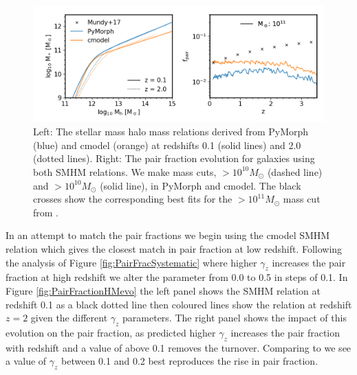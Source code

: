 \begin{figure}
	\centering
	\includegraphics[width = \linewidth]{Figures/Chapter5/PairFractionData.png}
    \caption{Left: The stellar mass halo mass relations derived from PyMorph (blue) and cmodel (orange) at redshifts 0.1 (solid lines) and 2.0 (dotted lines). Right: The pair fraction evolution for galaxies using both SMHM relations. We make mass cuts, $>10^{10}M_{\odot}$ (dashed line) and $>10^{10}M_{\odot}$ (solid line), in PyMorph and cmodel. The black crosses show the corresponding best fits for the $>10^{11}M_{\odot}$ mass cut from \citet{Mundy2017A3.5}.}
	\label{fig:PairFractionData}
\end{figure}

In an attempt to match the \citet{Mundy2017A3.5} pair fractions we begin using the cmodel SMHM relation which gives the closest match in pair fraction at low redshift. Following the analysis of Figure \ref{fig:PairFracSystematic} where higher $\gamma_{z}$ increases the pair fraction at high redshift we alter the parameter from 0.0 to 0.5 in steps of 0.1. In Figure \ref{fig:PairFractionHMevo} the left panel shows the SMHM relation at redshift 0.1 as a black dotted line then coloured lines show the relation at redshift $z = 2$ given the different $\gamma_{z}$ parameters. The right panel shows the impact of this evolution on the pair fraction, as predicted higher $\gamma_{z}$ increases the pair fraction with redshift and a value of above 0.1 removes the turnover. Comparing to \citet{Mundy2017A3.5} we see a value of $\gamma_{z}$ between 0.1 and 0.2 best reproduces the rise in pair fraction. 

